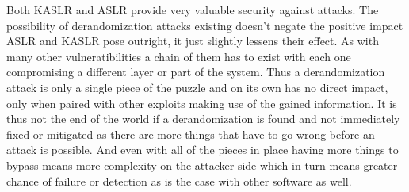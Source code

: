 Both KASLR and ASLR provide very valuable security against attacks.
The possibility of derandomization attacks existing doesn't negate the positive impact ASLR and KASLR pose outright, it just slightly lessens their effect.
As with many other vulneratibilities a chain of them has to exist with each one compromising a different layer or part of the system.
Thus a derandomization attack is only a single piece of the puzzle and on its own has no direct impact, only when paired with other exploits making use of the gained information.
It is thus not the end of the world if a derandomization is found and not immediately fixed or mitigated as there are more things that have to go wrong before an attack is possible.
And even with all of the pieces in place having more things to bypass means more complexity on the attacker side which in turn means greater chance of failure or detection as is the case with other software as well.
